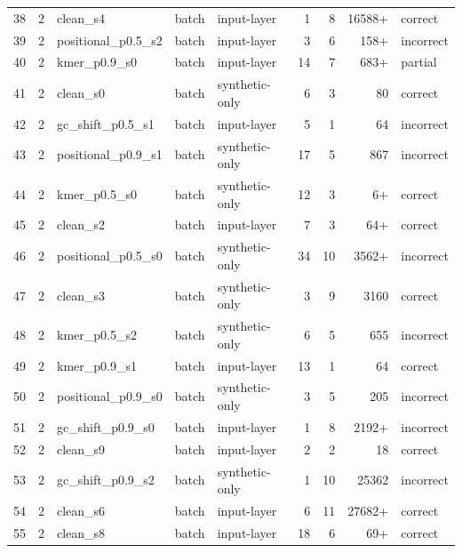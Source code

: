 \begin{longtable}{rrlllrrrl}
38 & 2 & clean\_s4 & batch & input-layer & 1 & 8 & 16588+ & correct \\
39 & 2 & positional\_p0.5\_s2 & batch & input-layer & 3 & 6 & 158+ & incorrect \\
40 & 2 & kmer\_p0.9\_s0 & batch & input-layer & 14 & 7 & 683+ & partial \\
41 & 2 & clean\_s0 & batch & synthetic-only & 6 & 3 & 80 & correct \\
42 & 2 & gc\_shift\_p0.5\_s1 & batch & input-layer & 5 & 1 & 64 & incorrect \\
43 & 2 & positional\_p0.9\_s1 & batch & synthetic-only & 17 & 5 & 867 & incorrect \\
44 & 2 & kmer\_p0.5\_s0 & batch & synthetic-only & 12 & 3 & 6+ & correct \\
45 & 2 & clean\_s2 & batch & input-layer & 7 & 3 & 64+ & correct \\
46 & 2 & positional\_p0.5\_s0 & batch & synthetic-only & 34 & 10 & 3562+ & incorrect \\
47 & 2 & clean\_s3 & batch & synthetic-only & 3 & 9 & 3160 & correct \\
48 & 2 & kmer\_p0.5\_s2 & batch & synthetic-only & 6 & 5 & 655 & incorrect \\
49 & 2 & kmer\_p0.9\_s1 & batch & input-layer & 13 & 1 & 64 & correct \\
50 & 2 & positional\_p0.9\_s0 & batch & synthetic-only & 3 & 5 & 205 & incorrect \\
51 & 2 & gc\_shift\_p0.9\_s0 & batch & input-layer & 1 & 8 & 2192+ & incorrect \\
52 & 2 & clean\_s9 & batch & input-layer & 2 & 2 & 18 & correct \\
53 & 2 & gc\_shift\_p0.9\_s2 & batch & synthetic-only & 1 & 10 & 25362 & incorrect \\
54 & 2 & clean\_s6 & batch & input-layer & 6 & 11 & 27682+ & correct \\
55 & 2 & clean\_s8 & batch & input-layer & 18 & 6 & 69+ & correct \\
\bottomrule
\end{longtable}
